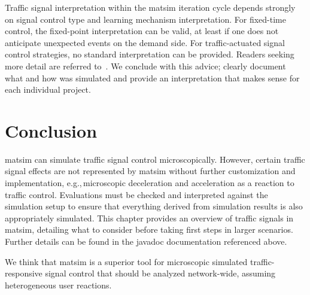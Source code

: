 Traffic signal interpretation within the \gls{matsim} iteration cycle depends strongly on signal control type and learning mechanism interpretation. 
For fixed-time control, the fixed-point interpretation can be valid, at least if one does not anticipate  unexpected events on the demand side. 
For traffic-actuated signal control strategies, no standard interpretation can be provided. 
Readers seeking more detail are referred to~\citet[][pp.~75]{Grether2014PhD}.  
We conclude with this advice; clearly document what and how was simulated and provide an interpretation that makes sense for each individual project.    

\section{Conclusion} 
\label{sec:signals_evaluation_conclusion}
\gls{matsim} can simulate traffic signal control microscopically. 
However, certain traffic signal effects are not represented by \gls{matsim} without further customization and implementation, e.g.,\,microscopic deceleration and acceleration as a reaction to traffic control. Evaluations must be checked and interpreted against the simulation setup to ensure that everything derived from simulation results is also appropriately simulated.  
This chapter provides an overview of traffic signals in \gls{matsim}, detailing what to consider before taking first steps in larger scenarios. Further details can be found in the \gls{javadoc} documentation referenced above. 

We think that \gls{matsim} is a superior tool for microscopic simulated traffic-responsive signal control that should be analyzed network-wide, assuming heterogeneous user reactions. 

 
